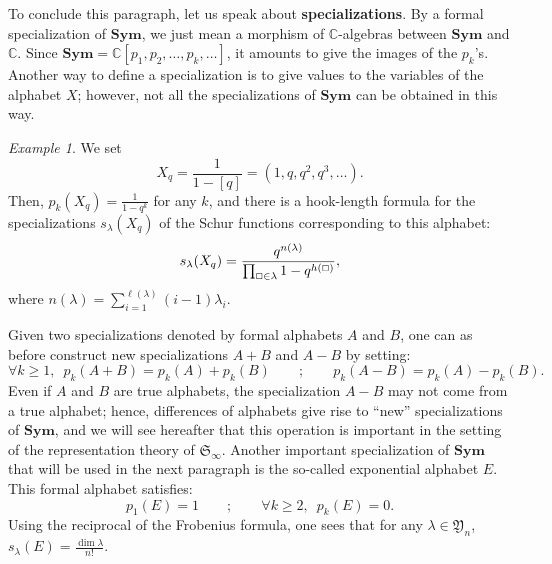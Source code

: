 \documentclass[smallextended,nospthms]{svjour3}
\theoremstyle{remark}
\newtheorem*{example}{Example}
\newcommand{\C}{\mathbb{C}}
\newcommand{\sym}{\mathfrak{S}}
\newcommand{\Sym}{\mathbf{Sym}}
\newcommand{\ym}{\mathfrak{Y}}
\begin{document}
To conclude this paragraph, let us speak about \textbf{specializations}. By a formal specialization of $\Sym$, we just mean a morphism of $\C$-algebras between $\Sym$ and $\C$. Since $\Sym=\C[p_{1},p_{2},\ldots,p_{k},\ldots]$, it amounts to give the images of the $p_{k}$'s. Another way to define a specialization is to give values to the variables of the alphabet $X$; however, not all the specializations of $\Sym$ can be obtained in this way. 
\begin{example} We set
$$X_{q}=\frac{1}{1-[q]}=(1,q,q^{2},q^{3},\ldots).$$
Then, $p_{k}(X_{q})=\frac{1}{1-q^{k}}$ for any $k$, and there is a hook-length formula for the specializations $s_{\lambda}(X_{q})$ of the Schur functions corresponding to this alphabet:
$$s_{\lambda}(X_{q})=\frac{q^{n(\lambda)}}{\prod_{\oblong \in \lambda}1-q^{h(\oblong)}},$$
where $n(\lambda)=\sum_{i=1}^{\ell(\lambda)}(i-1)\lambda_{i}$. 
\end{example}\bigskip

Given two specializations denoted by formal alphabets $A$ and $B$, one can as before construct new specializations $A+B$ and $A-B$ by setting:
$$\forall k\geq 1,\,\,\,p_{k}(A+B)=p_{k}(A)+p_{k}(B)\qquad;\qquad p_{k}(A-B)=p_{k}(A)-p_{k}(B).$$
Even if $A$ and $B$ are true alphabets, the specialization $A-B$ may not come from a true alphabet; hence, differences of alphabets give rise to ``new'' specializations of $\Sym$, and we will see hereafter that this operation is important in the setting of the representation theory of $\sym_{\infty}$. Another important specialization of $\Sym$ that will be used in the next paragraph is the so-called exponential alphabet $E$. This formal alphabet satisfies:
$$p_{1}(E)=1\qquad;\qquad\forall k \geq 2,\,\,\,p_{k}(E)=0.$$
Using the reciprocal of the Frobenius formula, one sees that for any $\lambda \in \ym_{n}$, $s_{\lambda}(E)=\frac{\dim \lambda}{n!}$.
\end{document}
